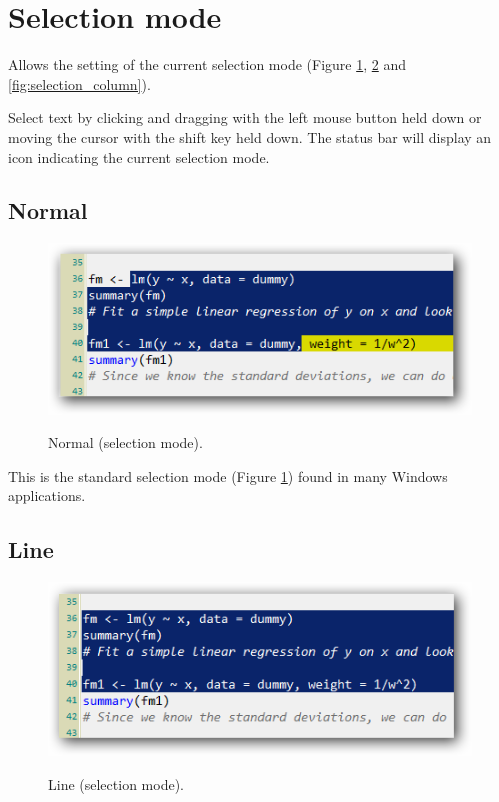 
\hypertarget{working_selectionmode}{}
\section{Selection mode}

Allows the setting of the current selection mode
(Figure \ref{fig:selection_normal},
\ref{fig:selection_line} and
\ref{fig:selection_column}).

Select text by clicking and dragging with the left mouse button held
down or moving the cursor with the shift key held down. The status
bar will display an icon indicating the current selection mode.

\hypertarget{working_selectionmode_normal}{}
\subsection{Normal}

\begin{figure}[h!]
  \includegraphics[scale=0.35]{./res/selection_normal.png}\\
  \caption{Normal (selection mode).}
  \label{fig:selection_normal}
\end{figure}

This is the standard selection mode
(Figure \ref{fig:selection_normal})
found in many Windows applications.

\hypertarget{working_selectionmode_line}{}
\subsection{Line}

\begin{figure}[h!]
  \includegraphics[scale=0.35]{./res/selection_line.png}\\
  \caption{Line (selection mode).}
  \label{fig:selection_line}
\end{figure}

